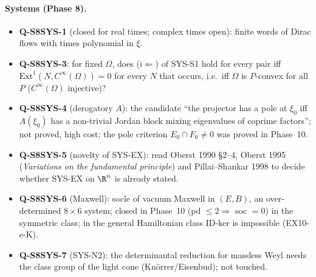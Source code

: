 \paragraph{Systems (Phase 8).}
\begin{itemize}
\item \textbf{Q-S8SYS-1} (closed for real times; complex times open): finite words of Dirac flows with times polynomial in $\xi$.
\item \textbf{Q-S8SYS-3}: for fixed $\Omega$, does (i$\Leftarrow$) of SYS-S1 hold for every pair iff $\mathrm{Ext}^1(N,C^\infty(\Omega))=0$ for every $N$ that occurs, i.e.\ iff $\Omega$ is $P$-convex for all $P$ ($C^\infty(\Omega)$ injective)?
\item \textbf{Q-S8SYS-4} (derogatory $A$): the candidate ``the projector has a pole at $\xi_0$ iff $A(\xi_0)$ has a non-trivial Jordan block mixing eigenvalues of coprime factors''; not proved, high cost; the pole criterion $E_0\cap F_0\ne0$ was proved in Phase~10.
\item \textbf{Q-S8SYS-5} (novelty of SYS-EX): read Oberst 1990 \S2--4, Oberst 1995 (\emph{Variations on the fundamental principle}) and Pillai--Shankar 1998 to decide whether SYS-EX on $\R^n$ is already stated.
\item \textbf{Q-S8SYS-6} (Maxwell): socle of vacuum Maxwell in $(E,B)$, an over-determined $8\times6$ system; closed in Phase~10 (pd $\le2\Rightarrow$ soc $=0$) in the symmetric class; in the general Hamiltonian class ID-ker is impossible (EX10-e-K).
\item \textbf{Q-S8SYS-7} (SYS-N2): the determinantal reduction for massless Weyl needs the class group of the light cone (Kn\"orrer/Eisenbud); not touched.
\end{itemize}

